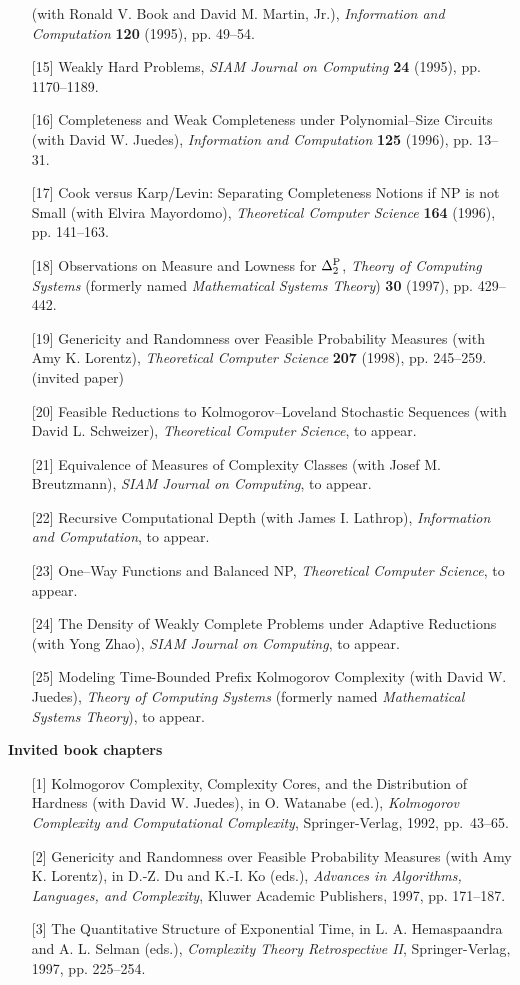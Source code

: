 \begin{enumerate}
(with Ronald V. Book and David M. Martin, Jr.),
{\it Information and Computation} {\bf 120} (1995), pp. 49--54.
\item[{[15]}] Weakly Hard Problems, {\it
SIAM Journal on Computing} {\bf 24} (1995), pp. 1170--1189.
\item[{[16]}] Completeness and Weak Completeness under
Polynomial--Size Circuits (with David W. Juedes), {\it Information
and Computation} {\bf 125} (1996), pp. 13--31.
\item[{[17]}] Cook versus Karp/Levin: Separating Completeness
Notions if NP is not Small (with Elvira Mayordomo),
{\it Theoretical Computer Science\/} {\bf 164} (1996), pp. 141--163.
\item[{[18]}] Observations on Measure and Lowness for $\Delta^{\rm
P}_{2}$, {\it Theory of Computing Systems} (formerly named
{\it Mathematical Systems Theory}) {\bf 30} (1997), pp. 429--442.
\item[{[19]}] Genericity and Randomness over Feasible Probability
Measures (with Amy K. Lorentz), {\it Theoretical Computer Science}
{\bf 207} (1998), pp. 245--259. (invited paper)
\item[{[20]}] Feasible Reductions to Kolmogorov--Loveland Stochastic
Sequences (with David L. Schweizer), {\it Theoretical Computer Science},
to appear.
\item[{[21]}] Equivalence of Measures of Complexity Classes (with
Josef M. Breutzmann), {\it SIAM Journal on Computing}, to appear.
\item[{[22]}] Recursive Computational Depth (with James I. Lathrop),
{\it Information and Computation}, to appear.
\item[{[23]}] One--Way Functions and Balanced NP, {\it Theoretical
Computer Science}, to appear.
\item[{[24]}] The Density of Weakly Complete Problems under
Adaptive Reductions (with Yong Zhao), {\it SIAM Journal on 
Computing}, to appear.
\item[{[25]}] Modeling Time-Bounded Prefix Kolmogorov Complexity
(with David W. Juedes), {\it Theory of Computing
Systems} (formerly named {\it Mathematical Systems Theory}),
to appear.
\end{enumerate}

\newpage
{\bf Invited book chapters}

\begin{enumerate}
\item[{[1]}] Kolmogorov Complexity, Complexity Cores, and the
Distribution of Hardness (with David W. Juedes), in O.
Watanabe (ed.), {\it Kolmogorov Complexity and Computational 
Complexity}, Springer-Verlag, 1992, pp.~43--65.
\item[{[2]}] Genericity and Randomness over Feasible Probability
Measures (with Amy K. Lorentz), in D.-Z. Du and K.-I. Ko (eds.),
{\it Advances in Algorithms, Languages, and Complexity}, Kluwer
Academic Publishers, 1997, pp. 171--187.
\item[{[3]}] The Quantitative Structure of Exponential Time,
in L. A. Hemaspaandra and A. L. Selman (eds.), {\it
Complexity Theory Retrospective II}, Springer-Verlag, 1997,
pp. 225--254.
\end{enumerate}

